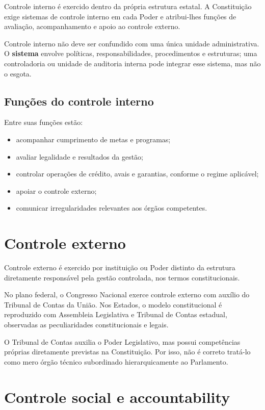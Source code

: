 Controle interno é exercido dentro da própria estrutura estatal. A Constituição exige sistemas de controle interno em cada Poder e atribui-lhes funções de avaliação, acompanhamento e apoio ao controle externo.

Controle interno não deve ser confundido com uma única unidade administrativa. O \textbf{sistema} envolve políticas, responsabilidades, procedimentos e estruturas; uma controladoria ou unidade de auditoria interna pode integrar esse sistema, mas não o esgota.

\subsection{Funções do controle interno}

Entre suas funções estão:
\begin{itemize}
\item acompanhar cumprimento de metas e programas;
\item avaliar legalidade e resultados da gestão;
\item controlar operações de crédito, avais e garantias, conforme o regime aplicável;
\item apoiar o controle externo;
\item comunicar irregularidades relevantes aos órgãos competentes.
\end{itemize}

\section{Controle externo}

Controle externo é exercido por instituição ou Poder distinto da estrutura diretamente responsável pela gestão controlada, nos termos constitucionais.

No plano federal, o Congresso Nacional exerce controle externo com auxílio do Tribunal de Contas da União. Nos Estados, o modelo constitucional é reproduzido com Assembleia Legislativa e Tribunal de Contas estadual, observadas as peculiaridades constitucionais e legais.

\begin{teoria}
O Tribunal de Contas auxilia o Poder Legislativo, mas possui competências próprias diretamente previstas na Constituição. Por isso, não é correto tratá-lo como mero órgão técnico subordinado hierarquicamente ao Parlamento.
\end{teoria}

\section{Controle social e accountability}

